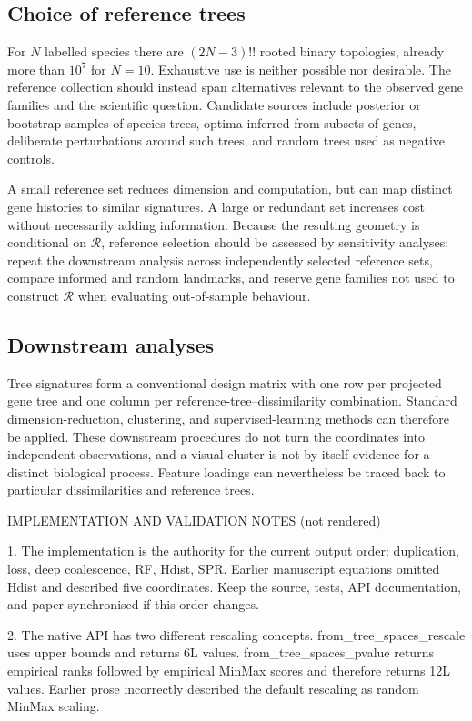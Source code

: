 \subsection{Choice of reference trees}

For $N$ labelled species there are $(2N-3)!!$ rooted binary topologies, already more than $10^7$ for $N=10$. Exhaustive
use is neither possible nor desirable. The reference collection should instead span alternatives relevant to the
observed gene families and the scientific question. Candidate sources include posterior or bootstrap samples of species
trees, optima inferred from subsets of genes, deliberate perturbations around such trees, and random trees used as
negative controls.

A small reference set reduces dimension and computation, but can map distinct gene histories to similar signatures. A
large or redundant set increases cost without necessarily adding information. Because the resulting geometry is
conditional on $\mathcal{R}$, reference selection should be assessed by sensitivity analyses: repeat the downstream
analysis across independently selected reference sets, compare informed and random landmarks, and reserve gene families
not used to construct $\mathcal{R}$ when evaluating out-of-sample behaviour.

\subsection{Downstream analyses}

Tree signatures form a conventional design matrix with one row per projected gene tree and one column per
reference-tree--dissimilarity combination. Standard dimension-reduction, clustering, and supervised-learning methods can
therefore be applied. These downstream procedures do not turn the coordinates into independent observations, and a
visual cluster is not by itself evidence for a distinct biological process. Feature loadings can nevertheless be traced
back to particular dissimilarities and reference trees.

\iffalse
IMPLEMENTATION AND VALIDATION NOTES (not rendered)

1. The implementation is the authority for the current output order:
   duplication, loss, deep coalescence, RF, Hdist, SPR. Earlier manuscript equations omitted Hdist and described five
   coordinates. Keep the source, tests, API documentation, and paper synchronised if this order changes.

2. The native API has two different rescaling concepts. from_tree_spaces_rescale uses upper bounds and returns 6L
   values. from_tree_spaces_pvalue returns empirical ranks followed by empirical MinMax scores and therefore returns
   12L values. Earlier prose incorrectly described the default rescaling as random MinMax scaling.

